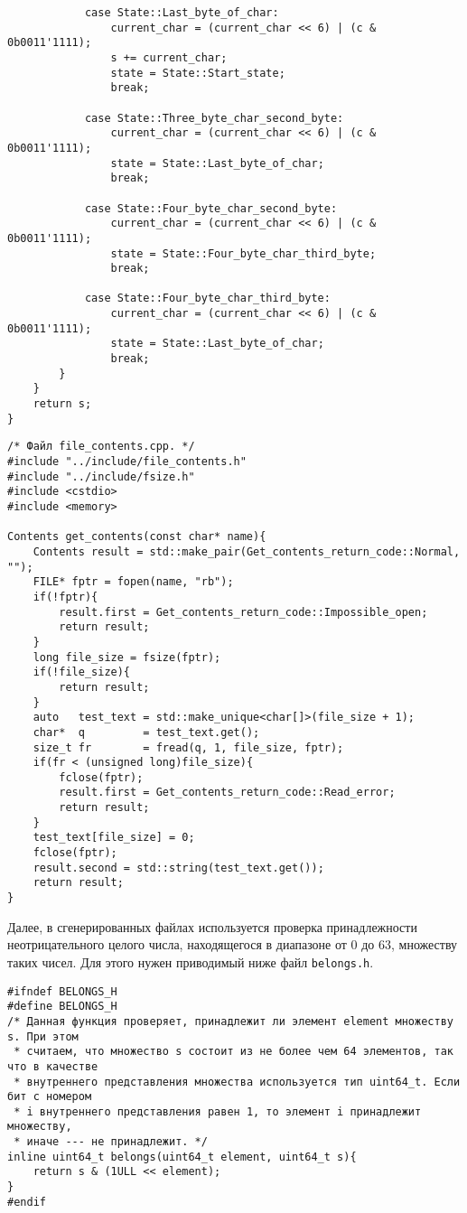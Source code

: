\documentclass[10pt]{report}
\newcounter{lem}[section]
\newcounter{defin}[section]
\begin{document}
\begin{verbatim}
            case State::Last_byte_of_char:
                current_char = (current_char << 6) | (c & 0b0011'1111);
                s += current_char;
                state = State::Start_state;
                break;

            case State::Three_byte_char_second_byte:
                current_char = (current_char << 6) | (c & 0b0011'1111);
                state = State::Last_byte_of_char;
                break;

            case State::Four_byte_char_second_byte:
                current_char = (current_char << 6) | (c & 0b0011'1111);
                state = State::Four_byte_char_third_byte;
                break;

            case State::Four_byte_char_third_byte:
                current_char = (current_char << 6) | (c & 0b0011'1111);
                state = State::Last_byte_of_char;
                break;
        }
    }
    return s;
}
\end{verbatim}
\begin{verbatim}
/* Файл file_contents.cpp. */
#include "../include/file_contents.h"
#include "../include/fsize.h"
#include <cstdio>
#include <memory>

Contents get_contents(const char* name){
    Contents result = std::make_pair(Get_contents_return_code::Normal, "");
    FILE* fptr = fopen(name, "rb");
    if(!fptr){
        result.first = Get_contents_return_code::Impossible_open;
        return result;
    }
    long file_size = fsize(fptr);
    if(!file_size){
        return result;
    }
    auto   test_text = std::make_unique<char[]>(file_size + 1);
    char*  q         = test_text.get();
    size_t fr        = fread(q, 1, file_size, fptr);
    if(fr < (unsigned long)file_size){
        fclose(fptr);
        result.first = Get_contents_return_code::Read_error;
        return result;
    }
    test_text[file_size] = 0;
    fclose(fptr);
    result.second = std::string(test_text.get());
    return result;
}
\end{verbatim}

Далее, в сгенерированных файлах используется проверка принадлежности неотрицательного целого числа, находящегося в диапазоне от 0 до 63, множеству таких 
чисел. Для этого нужен приводимый ниже файл \texttt{belongs.h}.
\begin{verbatim}
#ifndef BELONGS_H
#define BELONGS_H
/* Данная функция проверяет, принадлежит ли элемент element множеству s. При этом
 * считаем, что множество s состоит из не более чем 64 элементов, так что в качестве
 * внутреннего представления множества используется тип uint64_t. Если бит с номером
 * i внутреннего представления равен 1, то элемент i принадлежит множеству,
 * иначе --- не принадлежит. */
inline uint64_t belongs(uint64_t element, uint64_t s){
    return s & (1ULL << element);
}
#endif
\end{verbatim}
\end{document}
